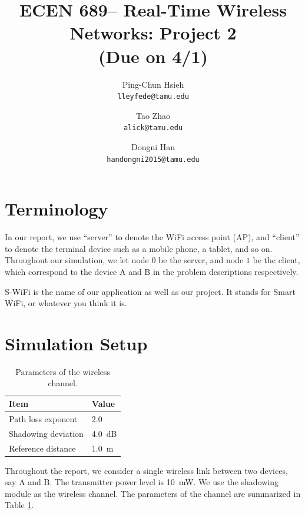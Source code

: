 \documentclass{article}
\begin{document}
\title{\bf ECEN 689-- Real-Time Wireless Networks: Project 2\\ (Due on 4/1)}
\date{}
\author{%
Ping-Chun Hsieh\\
\texttt{lleyfede@tamu.edu}
\and
Tao Zhao\\
\texttt{alick@tamu.edu}
\and
Dongni Han\\
\texttt{handongni2015@tamu.edu}
}
\maketitle

\section*{Terminology}

In our report, we use ``server'' to denote the WiFi access point (AP), and
``client'' to denote the terminal device such as a mobile phone, a tablet, and
so on. Throughout our simulation, we let node $0$ be the server, and node $1$ be
the client, which correspond to the device A and B in the problem descriptions
respectively.

S-WiFi is the name of our application as well as our project. It stands for
Smart WiFi, or whatever you think it is.

\section*{Simulation Setup}
\begin{table}[htbp]
\centering
    \caption{Parameters of the wireless channel.}
    \vspace{2mm}
    \begin{tabular}{ | l | l | }
    \hline
    Item & Value \\ \hline
    Path loss exponent & 2.0  \\ \hline
    Shadowing deviation & \SI{4.0}{dB} \\ \hline
    Reference distance & \SI{1.0}{m} \\
    \hline
\end{tabular}
\label{table: channel}
\end{table}
Throughout the report, we consider a single wireless link between two devices, say A and B. The transmitter power level is \SI{10}{mW}. We use the shadowing module as the wireless channel. The parameters of the channel are summarized in Table \ref{table: channel}.
\end{document}
